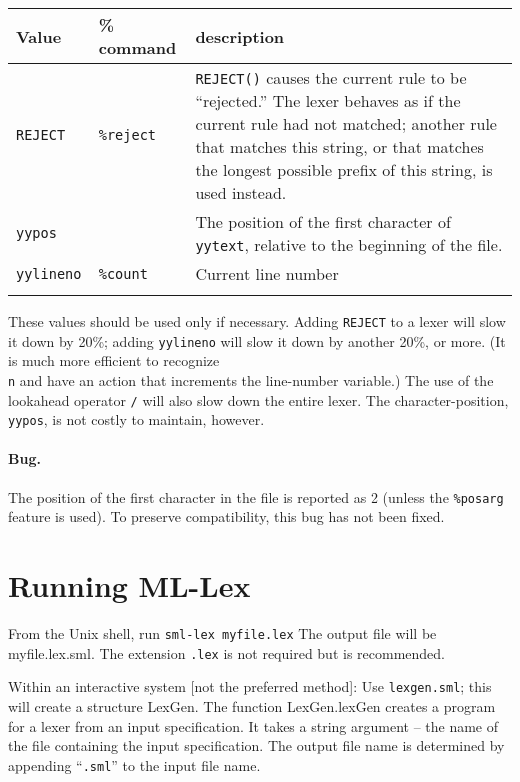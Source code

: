 \begin{tabular}{lll}
\\
{\bf Value}&{\bf \% command}&{\bf description}\\
\hline
{\tt REJECT} &{\tt\%reject}&\parbox[t]{2.6in}{{\tt REJECT()} causes the current
                                        rule to be ``rejected.''
                                        The lexer behaves as if the
                                        current rule had not matched;
                                        another rule that matches this
                                        string, or that matches the longest
                                        possible prefix of this string,
                                        is used instead.} \\
{\tt yypos} & & \parbox[t]{2.6in}{The position of the first character
of {\tt yytext}, relative to the beginning of the file.}\\
{\tt yylineno } & {\tt \%count} &         Current line number\\
\\
\end{tabular}
        

These values should be used only if necessary.  Adding {\tt REJECT} to a
lexer will slow it down by 20\%; adding {\tt yylineno} will slow it down by
another 20\%, or more.  (It is much more efficient to 
recognize {\tt \\n} and
have an action that increments the line-number variable.)  The use of
the lookahead operator {\tt /} will also slow down the entire lexer.
The character-position, {\tt yypos}, is not costly to maintain, however.

\paragraph{Bug.} The position of the first character in the file
is reported as 2 (unless the {\tt \%posarg} feature is used).
To preserve compatibility, this bug has not been fixed.

\section{Running ML-Lex}

From the Unix shell, run    {\tt sml-lex~myfile.lex}
The output file will be myfile.lex.sml.  The extension {\tt .lex} is not
required but is recommended.

Within an interactive system [not the preferred method]:
Use {\tt lexgen.sml}; this will create a structure LexGen.  The function
LexGen.lexGen creates a program for a lexer from an input
specification.  It takes a string argument -- the name of the file
containing the input specification.  The output file name is
determined by appending ``{\tt .sml}'' to the input file name.

